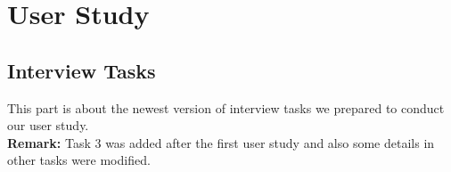 

\section{User Study}\label{sec:user-study}  %
\subsection{Interview Tasks}\label{subsec:tasks}
This part is about the newest version of interview tasks we prepared to conduct our user study.\\
\textbf{Remark:} Task 3 was added after the first user study and also some details in other tasks were modified.

